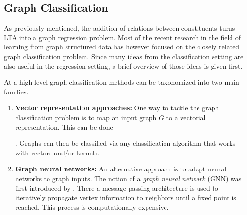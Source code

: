 \documentclass[12pt]{scrartcl}
\begin{document}
\subsection{Graph Classification}%
\label{sec:related-work:gc}

As previously mentioned, the addition of relations between constituents turns LTA into a graph regression problem.
Most of the recent research in the field of learning from graph structured data has however focused on the closely related graph classification problem.
Since many ideas from the classification setting are also useful in the regression setting, a brief overview of those ideas is given first.

At a high level graph classification methods can be taxonomized into two main families:
\begin{enumerate}[label=\textbf{\arabic*.}]
	\item \textbf{Vector representation approaches:}
		One way to tackle the graph classification problem is to map an input graph $G$ to a vectorial representation.
		This can be done
		.
		Graphs can then be classified via any classification algorithm that works with vectors and/or kernels.
	\item \textbf{Graph neural networks:}
		An alternative approach is to adapt neural networks to graph inputs.
		The notion of a \textit{graph neural network} (GNN) was first introduced by \citet{Gori2005}.\@
		There a message-passing architecture is used to iteratively propagate vertex information to neighbors until a fixed point is reached.
		This process is computationally expensive.


\end{enumerate}
\end{document}
